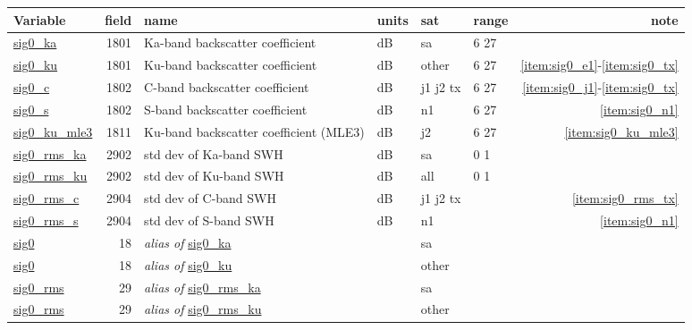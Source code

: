 \documentclass[a4paper,11pt,openany,natbib]{thesis}
\makeatletter
\newcommand\var[1]{\url{#1}\index{variables!#1@\protect\url{#1}}}
\newcommand\alias[1]{\emph{alias of} \var{#1}}
\newenvironment{vartable}{
\begin{table}[ht]
\small
\begin{tabular}{lrllllr}
\hline
Variable & field & name & units & sat & range & note \\
\hline
}{
\hline
\end{tabular}
\end{table}
}
\makeatother
\begin{document}
\begin{vartable}
\var{sig0_ka} & 1801 & Ka-band backscatter coefficient & dB & sa & 6 27 & \\
\var{sig0_ku} & 1801 & Ku-band backscatter coefficient & dB & other & 6 27 & \ref{item:sig0_e1}-\ref{item:sig0_tx} \\
\var{sig0_c} & 1802 & C-band backscatter coefficient & dB & j1 j2 tx & 6 27 & \ref{item:sig0_j1}-\ref{item:sig0_tx} \\
\var{sig0_s} & 1802 & S-band backscatter coefficient & dB & n1 & 6 27 & \ref{item:sig0_n1} \\
\var{sig0_ku_mle3} & 1811 & Ku-band backscatter coefficient (MLE3) & dB & j2 & 6 27 & \ref{item:sig0_ku_mle3} \\
\hline
\var{sig0_rms_ka} & 2902 & std dev of Ka-band SWH & dB & sa & 0 1 & \\
\var{sig0_rms_ku} & 2902 & std dev of Ku-band SWH & dB & all & 0 1 & \\
\var{sig0_rms_c} & 2904 & std dev of C-band SWH & dB & j1 j2 tx & & \ref{item:sig0_rms_tx} \\
\var{sig0_rms_s} & 2904 & std dev of S-band SWH & dB & n1 & & \ref{item:sig0_n1} \\
\hline
\var{sig0} & 18 & \alias{sig0_ka} && sa && \\
\var{sig0} & 18 & \alias{sig0_ku} && other && \\
\hline
\var{sig0_rms} & 29 & \alias{sig0_rms_ka} && sa && \\
\var{sig0_rms} & 29 & \alias{sig0_rms_ku} && other && \\
\end{vartable}
\end{document}
